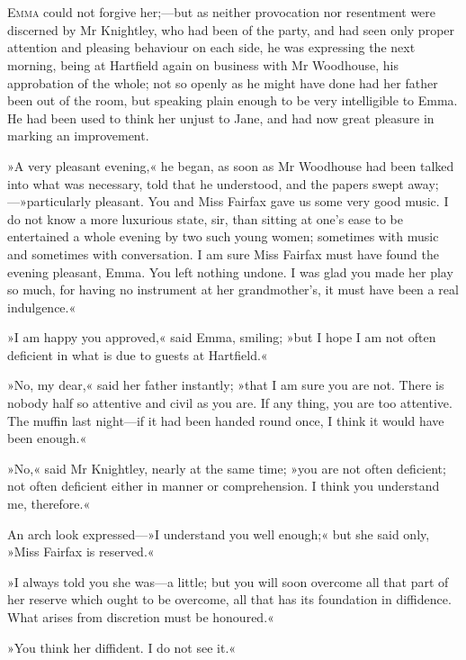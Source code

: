 \chapter[Chapter \thechapter]{}
\lettrine[lines=4,lraise=0.3]{E}{mma} could not forgive her;—but as neither provocation nor resentment were discerned by Mr Knightley, who had been of the party, and had seen only proper attention and pleasing behaviour on each side, he was expressing the next morning, being at Hartfield again on business with Mr Woodhouse, his approbation of the whole; not so openly as he might have done had her father been out of the room, but speaking plain enough to be very intelligible to Emma. He had been used to think her unjust to Jane, and had now great pleasure in marking an improvement.

»A very pleasant evening,« he began, as soon as Mr Woodhouse had been talked into what was necessary, told that he understood, and the papers swept away;—»particularly pleasant. You and Miss Fairfax gave us some very good music. I do not know a more luxurious state, sir, than sitting at one's ease to be entertained a whole evening by two such young women; sometimes with music and sometimes with conversation. I am sure Miss Fairfax must have found the evening pleasant, Emma. You left nothing undone. I was glad you made her play so much, for having no instrument at her grandmother's, it must have been a real indulgence.«

»I am happy you approved,« said Emma, smiling; »but I hope I am not often deficient in what is due to guests at Hartfield.«

»No, my dear,« said her father instantly; »that I am sure you are not. There is nobody half so attentive and civil as you are. If any thing, you are too attentive. The muffin last night—if it had been handed round once, I think it would have been enough.«

»No,« said Mr Knightley, nearly at the same time; »you are not often deficient; not often deficient either in manner or comprehension. I think you understand me, therefore.«

An arch look expressed—»I understand you well enough;« but she said only, »Miss Fairfax is reserved.«

»I always told you she was—a little; but you will soon overcome all that part of her reserve which ought to be overcome, all that has its foundation in diffidence. What arises from discretion must be honoured.«

»You think her diffident. I do not see it.«

